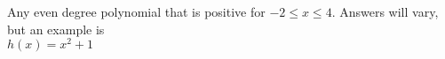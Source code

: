 {Any even degree polynomial that is positive for $-2 \leq x \leq 4$.}
{Answers will vary, but an example is \label{fig:01_05_ex_12}\\
$h(x)=x^2+1$}
